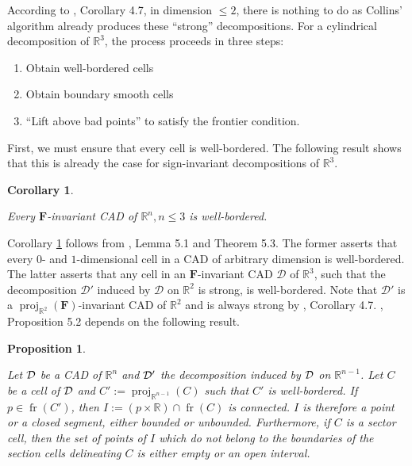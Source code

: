 \documentclass[
]{book}
\providecommand{\tightlist}{%
  \setlength{\itemsep}{0pt}\setlength{\parskip}{0pt}}
\newtheorem{corollary}{Corollary}[chapter]
\newtheorem{proposition}{Proposition}[chapter]
\theoremstyle{definition}
\theoremstyle{definition}
\theoremstyle{definition}
\theoremstyle{definition}
\theoremstyle{remark}
\begin{document}
According to \citet{lazard10}, Corollary 4.7, in dimension \(\le 2\), there is nothing to do as Collins' algorithm already produces these ``strong'' decompositions.
For a cylindrical decomposition of \(\mathbb{R}^3\), the process proceeds in three steps:

\begin{enumerate}
\def\labelenumi{\arabic{enumi}.}
\tightlist
\item
  Obtain well-bordered cells
\item
  Obtain boundary smooth cells
\item
  ``Lift above bad points'' to satisfy the frontier condition.
\end{enumerate}

First, we must ensure that every cell is well-bordered. The following result shows that this is already the case for sign-invariant decompositions of \(\mathbb{R}^3\).

\begin{corollary}
\protect\hypertarget{cor:lazard-5-4}{}\label{cor:lazard-5-4}\citep[Corollary 5.4]{lazard10}

Every \(\mathbf{F}\)-invariant CAD of \(\mathbb{R}^n, n \le 3\) is well-bordered.
\end{corollary}

Corollary \ref{cor:lazard-5-4} follows from \citet{lazard10}, Lemma 5.1 and Theorem 5.3.
The former asserts that every \(0\)- and \(1\)-dimensional cell in a CAD of arbitrary dimension is well-bordered.
The latter asserts that any cell in an \(\mathbf{F}\)-invariant CAD \(\mathcal{D}\) of \(\mathbb{R}^3\), such that the decomposition \(\mathcal{D}'\) induced by \(\mathcal{D}\) on \(\mathbb{R}^2\) is strong, is well-bordered.
Note that \(\mathcal{D}'\) is a \({\operatorname{proj}_{\mathbb{R}^{2}}}(\mathbf{F})\)-invariant CAD of \(\mathbb{R}^2\) and is always strong by \citet{lazard10}, Corollary 4.7.
\citet{lazard10}, Proposition 5.2 depends on the following result.

\begin{proposition}
\protect\hypertarget{prp:lazard-5-2}{}\label{prp:lazard-5-2}\citep[Proposition 5,2]{lazard10}

Let \(\cal D\) be a CAD of \(\mathbb{R}^n\) and \(\cal D'\) the decomposition induced by \(\cal D\) on \(\mathbb{R}^{n-1}\). Let \(C\) be a cell of \(\cal D\) and \(C' := {\operatorname{proj}_{\mathbb{R}^{n-1}}} (C)\) such that \(C'\) is well-bordered.
If \(p \in {\operatorname{fr} \left( C' \right)}\), then \(I := (p \times \mathbb{R}) \cap {\operatorname{fr} \left( C \right)}\) is connected.
\(I\) is therefore a point or a closed segment, either bounded or unbounded.
Furthermore, if \(C\) is a sector cell, then the set of points of \(I\) which do not belong to the boundaries of the section cells delineating \(C\) is either empty or an open interval.
\end{proposition}
\end{document}
